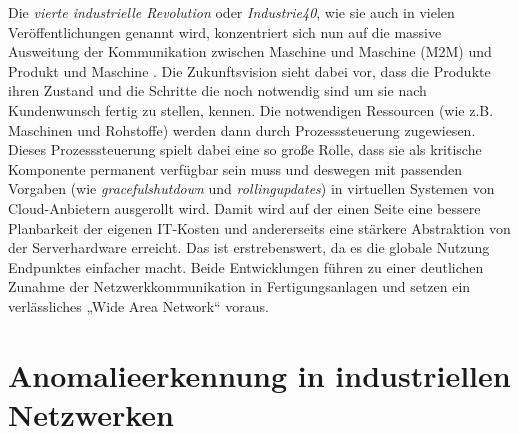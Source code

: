 Die \textit{vierte industrielle Revolution} oder \textit{\Gls{Industrie40}}, wie sie auch in vielen Veröffentlichungen genannt wird, konzentriert sich nun auf die massive Ausweitung der Kommunikation zwischen Maschine und Maschine (\Gls{M2M}) und Produkt und Maschine \cite{lasi2014industry}. Die Zukunftsvision sieht dabei vor, dass die Produkte ihren Zustand und die Schritte die noch notwendig sind um sie nach Kundenwunsch fertig zu stellen, kennen. Die notwendigen Ressourcen (wie z.B. Maschinen und Rohstoffe) werden dann durch Prozesssteuerung zugewiesen. Dieses Prozesssteuerung spielt dabei eine so große Rolle, dass sie als kritische Komponente permanent verfügbar sein muss und deswegen mit passenden Vorgaben (wie \textit{\Gls{gracefulshutdown}} und \textit{\Gls{rollingupdates}}) in virtuellen Systemen von Cloud-Anbietern ausgerollt wird. Damit wird auf der einen Seite eine bessere Planbarkeit der eigenen IT-Kosten und andererseits eine stärkere Abstraktion von der Serverhardware erreicht. Das ist erstrebenswert, da es die globale Nutzung Endpunktes einfacher macht\cite{wollschlaeger2017future}. Beide Entwicklungen führen zu einer deutlichen Zunahme der Netzwerkkommunikation in Fertigungsanlagen und setzen ein verlässliches „Wide Area Network“ voraus.\\

\section{Anomalieerkennung in industriellen Netzwerken}
